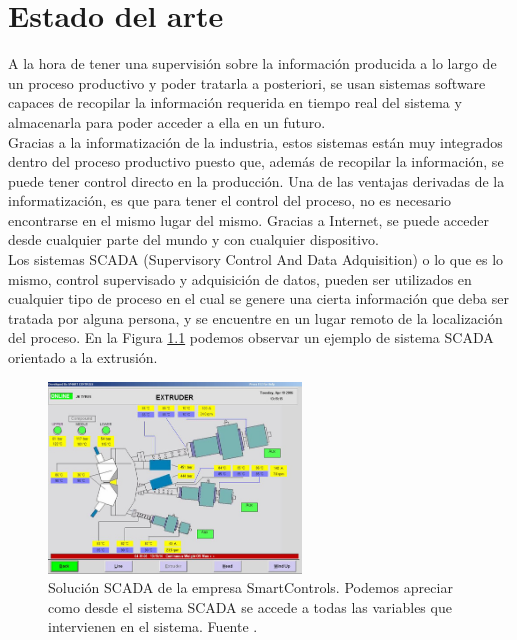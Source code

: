
\chapter{Estado del arte}
\label{cap:estado}
A la hora de tener una supervisión sobre la información producida a lo largo de un proceso productivo y poder tratarla a posteriori, se usan sistemas software capaces de recopilar la información requerida en tiempo real del sistema y almacenarla para poder acceder a ella en un futuro.\\

Gracias a la informatización de la industria, estos sistemas están muy integrados dentro del proceso productivo puesto que, además de recopilar la información, se puede tener control directo en la producción. Una de las ventajas derivadas de la informatización, es que para tener el control del proceso, no es necesario encontrarse en el mismo lugar del mismo. Gracias a Internet, se puede acceder desde cualquier parte del mundo y con cualquier dispositivo.\\

Los sistemas SCADA (Supervisory Control And Data Adquisition) o lo que es lo mismo, control supervisado y adquisición de datos, pueden ser utilizados en cualquier tipo de proceso en el cual se genere una cierta información que deba ser tratada por alguna persona, y se encuentre en un lugar remoto de la localización del proceso. En la Figura \ref{fig:smart_Controls} podemos observar un ejemplo de sistema SCADA orientado a la extrusión.

\begin{figure}[h!]
    \centering
    \includegraphics[width=0.6\textwidth]{images/triplex-extruder.jpg}
    \caption[Solución SCADA de la empresa SmartControls.]{Solución SCADA de la empresa SmartControls. Podemos apreciar como desde el sistema SCADA se accede a todas las variables que intervienen en el sistema. Fuente \cite{smartcontrols}.}
    \label{fig:smart_Controls}
\end{figure}

